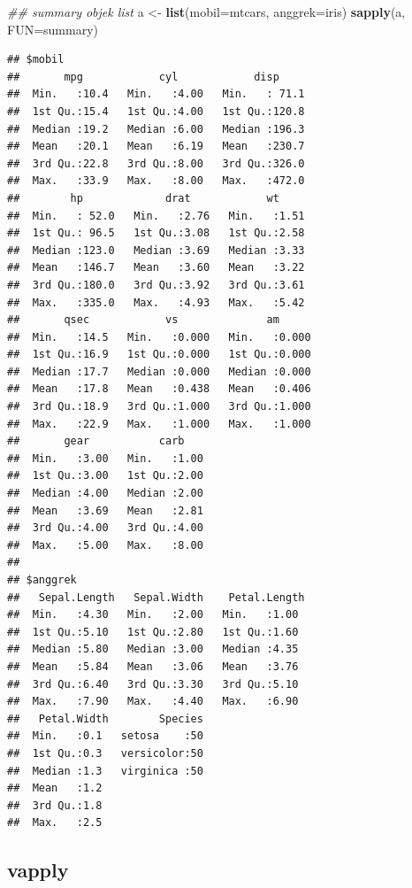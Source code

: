 \documentclass[]{book}
\newenvironment{Shaded}{\begin{snugshade}}{\end{snugshade}}
\newcommand{\CommentTok}[1]{\textcolor[rgb]{0.56,0.35,0.01}{\textit{#1}}}
\newcommand{\DataTypeTok}[1]{\textcolor[rgb]{0.13,0.29,0.53}{#1}}
\newcommand{\KeywordTok}[1]{\textcolor[rgb]{0.13,0.29,0.53}{\textbf{#1}}}
\newcommand{\NormalTok}[1]{#1}
\newcommand{\StringTok}[1]{\textcolor[rgb]{0.31,0.60,0.02}{#1}}
\theoremstyle{definition}
\theoremstyle{definition}
\theoremstyle{definition}
\theoremstyle{remark}
\begin{document}
\begin{Shaded}
\begin{Highlighting}[]
\CommentTok{## summary objek list}
\NormalTok{a <-}\StringTok{ }\KeywordTok{list}\NormalTok{(}\DataTypeTok{mobil=}\NormalTok{mtcars, }\DataTypeTok{anggrek=}\NormalTok{iris)}
\KeywordTok{sapply}\NormalTok{(a, }\DataTypeTok{FUN=}\NormalTok{summary)}
\end{Highlighting}
\end{Shaded}

\begin{verbatim}
## $mobil
##       mpg            cyl            disp      
##  Min.   :10.4   Min.   :4.00   Min.   : 71.1  
##  1st Qu.:15.4   1st Qu.:4.00   1st Qu.:120.8  
##  Median :19.2   Median :6.00   Median :196.3  
##  Mean   :20.1   Mean   :6.19   Mean   :230.7  
##  3rd Qu.:22.8   3rd Qu.:8.00   3rd Qu.:326.0  
##  Max.   :33.9   Max.   :8.00   Max.   :472.0  
##        hp             drat            wt      
##  Min.   : 52.0   Min.   :2.76   Min.   :1.51  
##  1st Qu.: 96.5   1st Qu.:3.08   1st Qu.:2.58  
##  Median :123.0   Median :3.69   Median :3.33  
##  Mean   :146.7   Mean   :3.60   Mean   :3.22  
##  3rd Qu.:180.0   3rd Qu.:3.92   3rd Qu.:3.61  
##  Max.   :335.0   Max.   :4.93   Max.   :5.42  
##       qsec            vs              am       
##  Min.   :14.5   Min.   :0.000   Min.   :0.000  
##  1st Qu.:16.9   1st Qu.:0.000   1st Qu.:0.000  
##  Median :17.7   Median :0.000   Median :0.000  
##  Mean   :17.8   Mean   :0.438   Mean   :0.406  
##  3rd Qu.:18.9   3rd Qu.:1.000   3rd Qu.:1.000  
##  Max.   :22.9   Max.   :1.000   Max.   :1.000  
##       gear           carb     
##  Min.   :3.00   Min.   :1.00  
##  1st Qu.:3.00   1st Qu.:2.00  
##  Median :4.00   Median :2.00  
##  Mean   :3.69   Mean   :2.81  
##  3rd Qu.:4.00   3rd Qu.:4.00  
##  Max.   :5.00   Max.   :8.00  
## 
## $anggrek
##   Sepal.Length   Sepal.Width    Petal.Length 
##  Min.   :4.30   Min.   :2.00   Min.   :1.00  
##  1st Qu.:5.10   1st Qu.:2.80   1st Qu.:1.60  
##  Median :5.80   Median :3.00   Median :4.35  
##  Mean   :5.84   Mean   :3.06   Mean   :3.76  
##  3rd Qu.:6.40   3rd Qu.:3.30   3rd Qu.:5.10  
##  Max.   :7.90   Max.   :4.40   Max.   :6.90  
##   Petal.Width        Species  
##  Min.   :0.1   setosa    :50  
##  1st Qu.:0.3   versicolor:50  
##  Median :1.3   virginica :50  
##  Mean   :1.2                  
##  3rd Qu.:1.8                  
##  Max.   :2.5
\end{verbatim}

\hypertarget{vapply}{%
\subsection{vapply}\label{vapply}}
\end{document}

